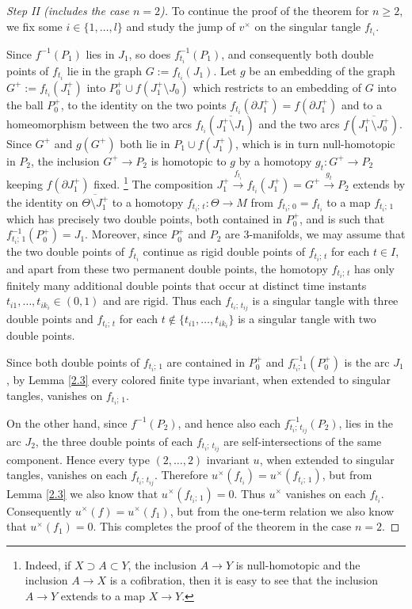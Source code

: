 \documentclass[a4paper,12pt,reqno,oneside]{amsart} %
\theoremstyle{plain}
\theoremstyle{definition}
\theoremstyle{named}
\def\x{\times}
\def\but{\setminus}
\renewcommand{\:}{\colon}
\def\xr#1{\xrightarrow{#1}}
\begin{document}
\begin{proof}[Step II (includes the case $n=2$)] 
To continue the proof of the theorem for $n\ge 2$, we fix some $i\in\{1,\dots,l\}$
and study the jump of $v^\x$ on the singular tangle $f_{t_i}$.

Since $f^{-1}(P_1)$ lies in $J_1$, so does $f_{t_i}^{-1}(P_1)$, and consequently
both double points of $f_{t_i}$ lie in the graph $G:=f_{t_i}(J_1)$.
Let $g$ be an embedding of the graph $G^+:=f_{t_i}(J_1^+)$ into $P_0^+\cup f(J_1^+\but J_0)$
which restricts to an embedding of $G$ into the ball $P_0^+$, to the identity on 
the two points $f_{t_i}(\partial J_1^+)=f(\partial J_1^+)$ and to a homeomorphism between 
the two arcs $f_{t_i}(\overline{J_1^+\but J_1})$ and the two arcs $f(\overline{J_1^+\but J_0^+})$.
Since $G^+$ and $g(G^+)$ both lie in $P_1\cup f(J_1^+)$, which is in turn null-homotopic in $P_2$,
the inclusion $G^+\to P_2$ is homotopic to $g$ by a homotopy $g_t\:G^+\to P_2$ 
keeping $f(\partial J_1^+)$ fixed.%
\footnote{Indeed, if $X\supset A\subset Y$, the inclusion $A\to Y$ is null-homotopic and the inclusion $A\to X$ 
is a cofibration, then it is easy to see that the inclusion $A\to Y$ extends to a map $X\to Y$.}
The composition $J_1^+\xr{f_{t_i}}f_{t_i}(J_1^+)=G^+\xr{g_t}P_2$ extends by the identity 
on $\overline{\Theta\but J_1^+}$ to a homotopy $f_{t_i;\,t}\:\Theta\to M$ from $f_{t_i;\,0}=f_{t_i}$ to a map $f_{t_i;\,1}$ 
which has precisely two double points, both contained in $P_0^+$, and is such that $f_{t_i;\,1}^{-1}(P_0^+)=J_1$.
Moreover, since $P_0^+$ and $P_2$ are $3$-manifolds, we may assume that the two double points of $f_{t_i}$ 
continue as rigid double points of $f_{t_i;\,t}$ for each $t\in I$, and apart from these two permanent double points, 
the homotopy $f_{t_i;\,t}$ has only finitely many additional double points that occur at distinct time instants 
$t_{i1},\dots,t_{ik_i}\in (0,1)$ and are rigid.
Thus each $f_{t_i;\,t_{ij}}$ is a singular tangle with three double points and $f_{t_i;\,t}$ for each 
$t\notin\{t_{i1},\dots,t_{ik_i}\}$ is a singular tangle with two double points.

Since both double points of $f_{t_i;\,1}$ are contained in $P_0^+$ and $f_{t_i;\,1}^{-1}(P_0^+)$ is the arc $J_1$,
by Lemma \ref{2.3} every colored finite type invariant, when extended to singular tangles, vanishes on $f_{t_i;\,1}$.

On the other hand, since $f^{-1}(P_2)$, and hence also each $f_{t_i;\,t_{ij}}^{-1}(P_2)$, lies in the arc $J_2$, 
the three double points of each $f_{t_i;\,t_{ij}}$ are self-intersections of the same component.
Hence every type $(2,\dots,2)$ invariant $u$, when extended to singular tangles, vanishes on each $f_{t_i;\,t_{ij}}$.
Therefore $u^\x(f_{t_i})=u^\x(f_{t_i;\,1})$, but from Lemma \ref{2.3} we also know that $u^\x(f_{t_i;\,1})=0$.
Thus $u^\x$ vanishes on each $f_{t_i}$.
Consequently $u^\x(f)=u^\x(f_1)$, but from the one-term relation we also know that $u^\x(f_1)=0$.
This completes the proof of the theorem in the case $n=2$.
\end{proof}
\end{document}
